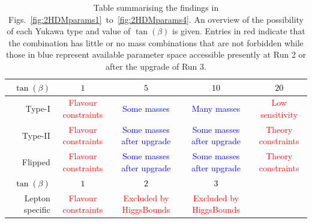 \begin{table}
\begin{tabularx}{\textwidth}{RCCCC}
      \toprule
      \textcolor{black}{\(\tan(\beta)\)}& \textcolor{black}{\(1\)} & \textcolor{black}{\(5\)} & \textcolor{black}{\(10\)} & \textcolor{black}{\(20\)}\\
      \toprule
      Type-I & \textcolor{red}{Flavour constraints} & \textcolor{blue}{Some masses} & \textcolor{blue}{Many masses} & \textcolor{red}{Low sensitivity} \\
      \hline
      Type-II &\textcolor{red}{Flavour constraints} & \textcolor{blue}{Some masses after upgrade} & \textcolor{blue}{Some masses after upgrade} & \textcolor{red}{Theory constraints}\\
      \hline
      Flipped &\textcolor{red}{Flavour constraints} & \textcolor{blue}{Some masses after upgrade} & \textcolor{blue}{Some masses after upgrade} & \textcolor{red}{Theory constraints}\\
      \toprule
      \textcolor{black}{\(\tan(\beta)\)}& \textcolor{black}{\(1\)} & \textcolor{black}{\(2\)} & \textcolor{black}{\(3\)} & \\
      \toprule
      Lepton specific & \textcolor{red}{Flavour constraints} & \textcolor{red}{Excluded by HiggsBounds} &  \textcolor{red}{Excluded by HiggsBounds} & \\
\end{tabularx}
\caption{Table summarising the findings in Figs.~\ref{fig:2HDMparams1}~to~\ref{fig:2HDMparams4}.
An overview of the possibility of each Yukawa type and value of \(\tan(\beta)\) is given.
Entries in red indicate that the combination has little or no mass combinations that are not forbidden while those in blue represent available parameter space accessible presently at Run 2  or after the upgrade of Run 3.}
\label{tab:summary}
\end{table}

